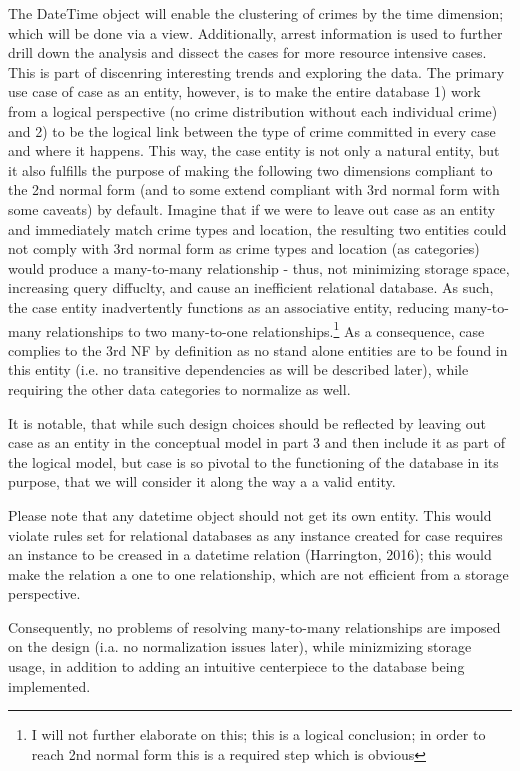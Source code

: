 \documentclass[a4paper]{article}
\begin{document}
The DateTime object will enable the clustering of crimes by the time dimension; which will be done via a view. Additionally, arrest information is used to further drill down the analysis and dissect the cases for more resource intensive cases. This is part of discenring interesting trends and exploring the data. The primary use case of case as an entity, however, is to make the entire database 1) work from a logical perspective (no crime distribution without each individual crime) and 2) to be the logical link between the type of crime committed in every case and where it happens. This way, the case entity is not only a natural entity, but it also fulfills the purpose of making the following two dimensions compliant to the 2nd normal form (and to some extend compliant with 3rd normal form with some caveats) by default. Imagine that if we were to leave out case as an entity and immediately match crime types and location, the resulting two entities could not comply with 3rd normal form as crime types and location (as categories) would produce a many-to-many relationship - thus, not minimizing storage space, increasing query diffuclty, and cause an inefficient relational database. As such, the case entity inadvertently functions as an associative entity, reducing many-to-many relationships to two many-to-one relationships.\footnote{I will not further elaborate on this; this is a logical conclusion; in order to reach 2nd normal form this is a required step which is obvious} As a consequence, case complies to the 3rd NF by definition as no stand alone entities are to be found in this entity (i.e. no transitive dependencies as will be described later), while requiring the other data categories to normalize as well.

 It is notable, that while such design choices should be reflected by leaving out case as an entity in the conceptual model in part 3 and then include it as part of the logical model, but case is so pivotal to the functioning of the database in its purpose, that we will consider it along the way a a valid entity.
 
Please note that any datetime object should not get its own entity. This would violate rules set for relational databases as any instance created for case requires an instance to be creased in a datetime relation (Harrington, 2016); this would make the relation a one to one relationship, which are not efficient from a storage perspective. 
 
Consequently, no problems of resolving many-to-many relationships are imposed on the design (i.a. no normalization issues later), while minizmizing storage usage, in addition to adding an intuitive centerpiece to the database being implemented.  
 
\end{document}
